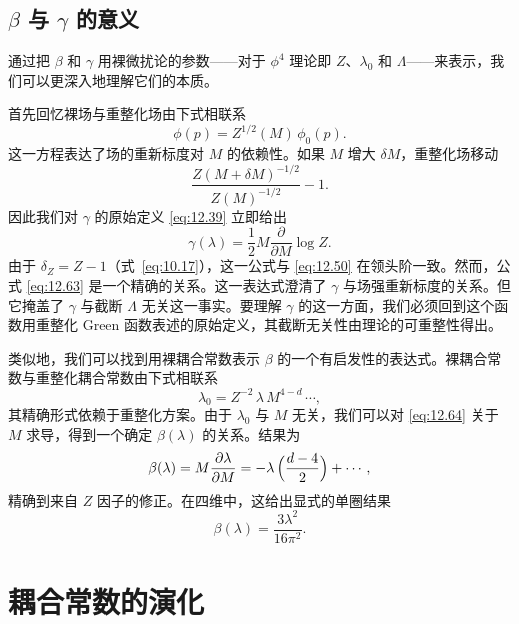 \subsection{$\beta$ 与 $\gamma$ 的意义}

通过把 $\beta$ 和 $\gamma$ 用裸微扰论的参数——对于 $\phi^4$ 理论即 $Z$、$\lambda_0$ 和 $\Lambda$——来表示，我们可以更深入地理解它们的本质。

首先回忆裸场与重整化场由下式相联系
\begin{equation}
  \phi(p) = Z^{1/2}(M)\,\phi_0(p) .
  \label{eq:12.62}
\end{equation}
这一方程表达了场的重新标度对 $M$ 的依赖性。如果 $M$ 增大 $\delta M$，重整化场移动
\begin{equation}
  \frac{Z(M+\delta M)^{-1/2}}{Z(M)^{-1/2}} - 1 .
\end{equation}
因此我们对 $\gamma$ 的原始定义 \eqref{eq:12.39} 立即给出
\begin{equation}
  \gamma(\lambda) = \frac{1}{2}M\frac{\partial}{\partial M}\log Z .
  \label{eq:12.63}
\end{equation}
由于 $\delta_Z = Z - 1$（式~\eqref{eq:10.17}），这一公式与 \eqref{eq:12.50} 在领头阶一致。然而，公式 \eqref{eq:12.63} 是一个精确的关系。这一表达式澄清了 $\gamma$ 与场强重新标度的关系。但它掩盖了 $\gamma$ 与截断 $\Lambda$ 无关这一事实。要理解 $\gamma$ 的这一方面，我们必须回到这个函数用重整化 Green 函数表述的原始定义，其截断无关性由理论的可重整性得出。

类似地，我们可以找到用裸耦合常数表示 $\beta$ 的一个有启发性的表达式。裸耦合常数与重整化耦合常数由下式相联系
\begin{equation}
  \lambda_0 = Z^{-2}\,\lambda\,M^{4-d}\,\cdots ,
  \label{eq:12.64}
\end{equation}
其精确形式依赖于重整化方案。由于 $\lambda_0$ 与 $M$ 无关，我们可以对 \eqref{eq:12.64} 关于 $M$ 求导，得到一个确定 $\beta(\lambda)$ 的关系。结果为
\begin{equation}
  \beta(\lambda) = M\frac{\partial\lambda}{\partial M}
  = -\lambda\,\Bigl( \frac{d-4}{2} \Bigr) + \cdots ,
  \label{eq:12.66}
\end{equation}
精确到来自 $Z$ 因子的修正。在四维中，这给出显式的单圈结果
\begin{equation}
  \beta(\lambda) = \frac{3\lambda^2}{16\pi^2} .
  \label{eq:12.46}
\end{equation}

\section{耦合常数的演化}

